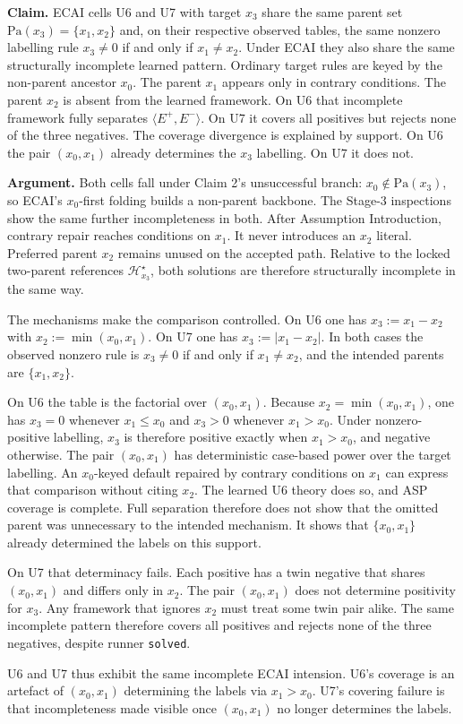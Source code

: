 \documentclass[11pt]{article}
\begin{document}
\textbf{Claim.} ECAI cells U6 and U7 with target \(x_3\) share the same parent set \(\mathrm{Pa}(x_3)=\{x_1,x_2\}\) and, on their respective observed tables, the same nonzero labelling rule \(x_3\neq 0\) if and only if \(x_1\neq x_2\). Under ECAI they also share the same structurally incomplete learned pattern. Ordinary target rules are keyed by the non-parent ancestor \(x_0\). The parent \(x_1\) appears only in contrary conditions. The parent \(x_2\) is absent from the learned framework. On U6 that incomplete framework fully separates \(\langle E^+,E^-\rangle\). On U7 it covers all positives but rejects none of the three negatives. The coverage divergence is explained by support. On U6 the pair \((x_0,x_1)\) already determines the \(x_3\) labelling. On U7 it does not.

\textbf{Argument.} Both cells fall under Claim 2's unsuccessful branch: \(x_0\notin\mathrm{Pa}(x_3)\), so ECAI's \(x_0\)-first folding builds a non-parent backbone. The Stage-3 inspections show the same further incompleteness in both. After Assumption Introduction, contrary repair reaches conditions on \(x_1\). It never introduces an \(x_2\) literal. Preferred parent \(x_2\) remains unused on the accepted path. Relative to the locked two-parent references \(\mathcal{H}_{x_3}^\star\), both solutions are therefore structurally incomplete in the same way.

The mechanisms make the comparison controlled. On U6 one has \(x_3:=x_1-x_2\) with \(x_2:=\min(x_0,x_1)\). On U7 one has \(x_3:=|x_1-x_2|\). In both cases the observed nonzero rule is \(x_3\neq 0\) if and only if \(x_1\neq x_2\), and the intended parents are \(\{x_1,x_2\}\).

On U6 the table is the factorial over \((x_0,x_1)\). Because \(x_2=\min(x_0,x_1)\), one has \(x_3=0\) whenever \(x_1\leq x_0\) and \(x_3>0\) whenever \(x_1>x_0\). Under nonzero-positive labelling, \(x_3\) is therefore positive exactly when \(x_1>x_0\), and negative otherwise. The pair \((x_0,x_1)\) has deterministic case-based power over the target labelling. An \(x_0\)-keyed default repaired by contrary conditions on \(x_1\) can express that comparison without citing \(x_2\). The learned U6 theory does so, and ASP coverage is complete. Full separation therefore does not show that the omitted parent was unnecessary to the intended mechanism. It shows that \(\{x_0,x_1\}\) already determined the labels on this support.

On U7 that determinacy fails. Each positive has a twin negative that shares \((x_0,x_1)\) and differs only in \(x_2\). The pair \((x_0,x_1)\) does not determine positivity for \(x_3\). Any framework that ignores \(x_2\) must treat some twin pair alike. The same incomplete pattern therefore covers all positives and rejects none of the three negatives, despite runner \texttt{solved}.

U6 and U7 thus exhibit the same incomplete ECAI intension. U6's coverage is an artefact of \((x_0,x_1)\) determining the labels via \(x_1>x_0\). U7's covering failure is that incompleteness made visible once \((x_0,x_1)\) no longer determines the labels.
\end{document}

